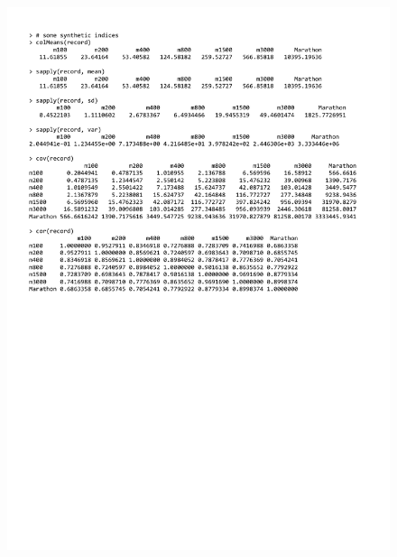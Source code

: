 \documentclass[a4paper]{article}
\begin{document}
    \newpage

    \begin{figure}[!htp]
        \centering
        \includegraphics[width=\textwidth]{img/example-analysis-of-quantitative-data-1.pdf}
    \end{figure}

    \newpage
\end{document}
